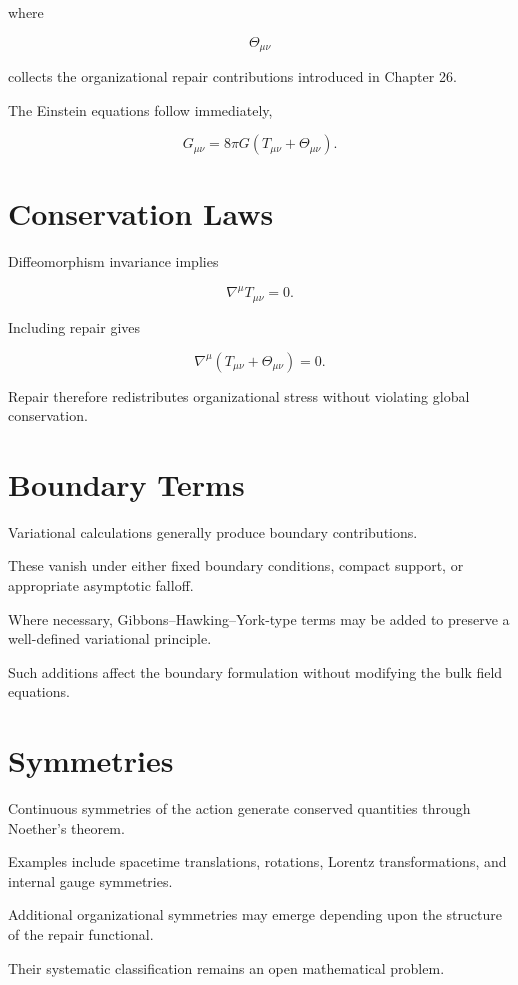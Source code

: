 \documentclass[11pt,oneside]{book}
\numberwithin{equation}{chapter}
\theoremstyle{definition}
\theoremstyle{plain}
\begin{document}
where

\[
\Theta_{\mu\nu}
\]

collects the organizational repair contributions introduced in Chapter 26.

The Einstein equations follow immediately,

\[
G_{\mu\nu}
=
8\pi G
\left(
T_{\mu\nu}
+
\Theta_{\mu\nu}
\right).
\]

\section{Conservation Laws}

Diffeomorphism invariance implies

\[
\nabla^\mu
T_{\mu\nu}
=
0.
\]

Including repair gives

\[
\nabla^\mu
\left(
T_{\mu\nu}
+
\Theta_{\mu\nu}
\right)
=
0.
\]

Repair therefore redistributes organizational stress without violating
global conservation.

\section{Boundary Terms}

Variational calculations generally produce boundary contributions.

These vanish under either fixed boundary conditions, compact support, or
appropriate asymptotic falloff.

Where necessary, Gibbons--Hawking--York-type terms may be added to
preserve a well-defined variational principle.

Such additions affect the boundary formulation without modifying the bulk
field equations.

\section{Symmetries}

Continuous symmetries of the action generate conserved quantities through
Noether's theorem.

Examples include spacetime translations, rotations, Lorentz
transformations, and internal gauge symmetries.

Additional organizational symmetries may emerge depending upon the
structure of the repair functional.

Their systematic classification remains an open mathematical problem.
\end{document}
